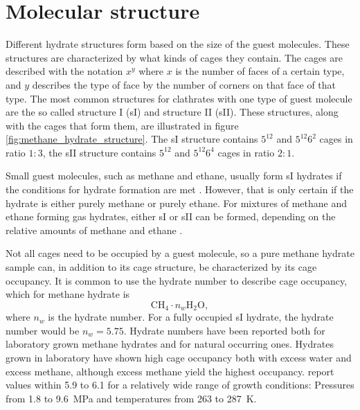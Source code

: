 \section{Molecular structure}
Different hydrate structures form based on the size of the guest molecules. These structures are characterized by what kinds of cages they contain. The cages are described with the notation $x^y$ where $x$ is the number of faces of a certain type, and $y$ describes the type of face by the number of corners on that face of that type. The most common structures for clathrates with one type of guest molecule are the so called structure I (sI) and structure II (sII). These structures, along with the cages that form them, are illustrated in figure \ref{fig:methane_hydrate_structure}. The sI structure contains $5^{12}$ and $5^{12}6^2$ cages in ratio $1:3$, the sII structure contains $5^{12}$ and $5^{12}6^4$ cages in ratio $2:1$.  

Small guest molecules, such as methane and ethane, usually form sI hydrates if the conditions for hydrate formation are met \cite{Hester2009}. However, that is only certain if the hydrate is either purely methane or purely ethane. For mixtures of methane and ethane forming gas hydrates, either sI or sII can be formed, depending on the relative amounts of methane and ethane \cite{Subramanian20001981}. 

Not all cages need to be occupied by a guest molecule, so a pure methane hydrate sample can, in addition to its cage structure, be characterized by its cage occupancy. It is common to use the hydrate number to describe cage occupancy, which for methane hydrate is
%
\begin{equation}
	\mathrm{CH_4} \cdot n_w \mathrm{H_2O},
\end{equation}
%
where $n_w$ is the hydrate number. For a fully occupied sI hydrate, the hydrate number would be $n_w = 5.75$. Hydrate numbers have been reported both for laboratory grown methane hydrates and for natural occurring ones. Hydrates grown in laboratory have shown high cage occupancy both with excess water and excess methane, although excess methane yield the highest occupancy. \citet{Circone2005} report values within 5.9 to 6.1 for a relatively wide range of growth conditions: Pressures from 1.8 to \SI{9.6}{\mega\pascal} and temperatures from 263 to \SI{287}{\kelvin}. 

